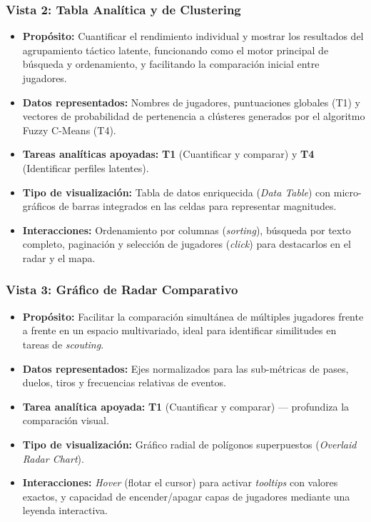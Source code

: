 \documentclass[conference]{IEEEtran}
\begin{document}
\subsubsection{Vista 2: Tabla Analítica y de Clustering}
\begin{itemize}
    \item \textbf{Propósito:} Cuantificar el rendimiento individual y mostrar los resultados del agrupamiento táctico latente, funcionando como el motor principal de búsqueda y ordenamiento, y facilitando la comparación inicial entre jugadores.
    \item \textbf{Datos representados:} Nombres de jugadores, puntuaciones globales (T1) y vectores de probabilidad de pertenencia a clústeres generados por el algoritmo Fuzzy C-Means (T4).
    \item \textbf{Tareas analíticas apoyadas:} \textbf{T1} (Cuantificar y comparar) y \textbf{T4} (Identificar perfiles latentes).
    \item \textbf{Tipo de visualización:} Tabla de datos enriquecida (\textit{Data Table}) con micro-gráficos de barras integrados en las celdas para representar magnitudes.
    \item \textbf{Interacciones:} Ordenamiento por columnas (\textit{sorting}), búsqueda por texto completo, paginación y selección de jugadores (\textit{click}) para destacarlos en el radar y el mapa.
\end{itemize}

\subsubsection{Vista 3: Gráfico de Radar Comparativo}
\begin{itemize}
    \item \textbf{Propósito:} Facilitar la comparación simultánea de múltiples jugadores frente a frente en un espacio multivariado, ideal para identificar similitudes en tareas de \textit{scouting}.
    \item \textbf{Datos representados:} Ejes normalizados para las sub-métricas de pases, duelos, tiros y frecuencias relativas de eventos.
    \item \textbf{Tarea analítica apoyada:} \textbf{T1} (Cuantificar y comparar) — profundiza la comparación visual.
    \item \textbf{Tipo de visualización:} Gráfico radial de polígonos superpuestos (\textit{Overlaid Radar Chart}).
    \item \textbf{Interacciones:} \textit{Hover} (flotar el cursor) para activar \textit{tooltips} con valores exactos, y capacidad de encender/apagar capas de jugadores mediante una leyenda interactiva.
\end{itemize}
\end{document}
